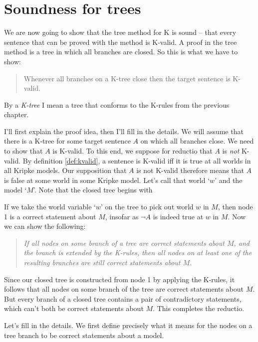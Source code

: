 \section{Soundness for trees}%
\label{sec:soundnesstrees}

We are now going to show that the tree method for K is sound -- that every sentence
that can be proved with the method is K-valid. A proof in the tree method is a
tree in which all branches are closed. So this is what we have to show:
%
\begin{quote}
  Whenever all branches on a K-tree close then the target sentence is K-valid.
\end{quote}
%
By a \emph{K-tree} I mean a tree that conforms to the K-rules from the previous
chapter.

I'll first explain the proof idea, then I'll fill in the details. We will assume
that there is a K-tree for some target sentence $A$ on which all branches close.
We need to show that $A$ is K-valid. To this end, we suppose for reductio that
$A$ is \emph{not} K-valid. By definition \ref{def:kvalid}, a sentence is K-valid
iff it is true at all worlds in all Kripke models. Our supposition that $A$ is
not K-valid therefore means that $A$ is false at some world in some Kripke
model. Let's call that world `$w$' and the model `$M$'. Note that the closed
tree begins with

\begin{center}
\end{center}

\noindent%
If we take the world variable `$w$' on the tree to pick out world $w$ in $M$,
then node 1 is a correct statement about $M$, insofar as $\neg A$ is indeed true
at $w$ in $M$. Now we can show the following:

\begin{quote}
    \emph{If all nodes on some branch of a tree are correct statements about
      $M$, and the branch is extended by the K-rules, then all nodes on at least
      one of the resulting branches are still correct statements about $M$.}
\end{quote}
%
Since our closed tree is constructed from node 1 by applying the K-rules, it
follows that all nodes on some branch of the tree are correct statements about
$M$. But every branch of a closed tree contains a pair of contradictory
statements, which can't both be correct statements about $M$. This completes the
reductio.

Let's fill in the details. We first define precisely what it means for the
nodes on a tree branch to be correct statements about a model.

